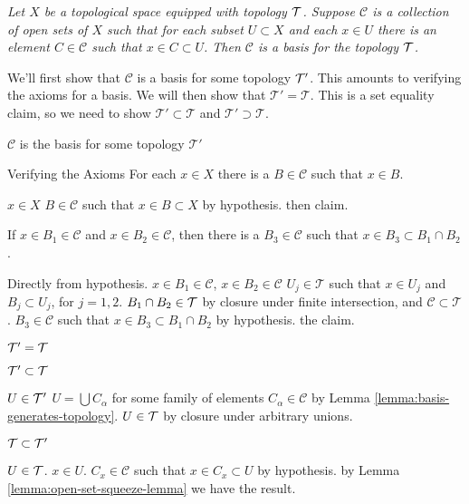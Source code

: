 %
{\itshape %
Let $X$ be a topological space equipped with topology $\mathcal{T}$.
Suppose $\mathcal{C}$ is a collection of open sets of $X$ such that for
each subset $U\subset X$ and each $x\in U$ there is an element
$C\in\mathcal{C}$ such that $x\in C\subset U$.
Then $\mathcal{C}$ is a basis for the topology $\mathcal{T}$.}

\smallskip

\begin{pfSketch}
  We'll first show that $\mathcal{C}$ is a basis for some topology
  $\mathcal{T'}$. This amounts to verifying the axioms for a basis. We
  will then show that $\mathcal{T'}=\mathcal{T}$. This is a set equality
  claim, so we need to show $\mathcal{T'}\subset\mathcal{T}$ and
  $\mathcal{T'}\supset\mathcal{T}$. 
\end{pfSketch}

\begin{spf}
  \step $\mathcal{C}$ is the basis for some topology $\mathcal{T'}$
  \begin{spf}
    Verifying the Axioms
    \step For each $x\in X$ there is a $B\in\mathcal{C}$ such that $x\in B$.
    \begin{spf}
      \Let $x\in X$
      \ThenConsider $B\in\mathcal{C}$ such that $x\in B\subset X$ by hypothesis.
      \Hence then claim.
    \end{spf}
    \step If $x\in B_{1}\in\mathcal{C}$ and
    $x\in B_{2}\in\mathcal{C}$, then there is a
    $B_{3}\in\mathcal{C}$ such that $x\in B_{3}\subset B_{1}\cap B_{2}$.
    \begin{spf}
      Directly from hypothesis.
      \Assume $x\in B_{1}\in\mathcal{C}$, $x\in B_{2}\in\mathcal{C}$
      \Consider $U_{j}\in\mathcal{T}$ such that $x\in U_{j}$ and
      $B_{j}\subset U_{j}$, for $j=1,2$.
      \Thus $B_{1}\cap B_{2}\in\mathcal{T}$ by closure under finite
      intersection, and $\mathcal{C}\subset\mathcal{T}$.
      \ThenConsider $B_{3}\in\mathcal{C}$ such that
      $x\in B_{3}\subset B_{1}\cap B_{2}$ by hypothesis.
      \Hence the claim.
    \end{spf}
  \end{spf}
  \step $\mathcal{T'}=\mathcal{T}$
  \begin{spf}
    \step $\mathcal{T'}\subset\mathcal{T}$
    \begin{spf}
      \Let $U\in\mathcal{T'}$
      \Then $U=\bigcup C_{\alpha}$ for some family of elements $C_{\alpha}\in\mathcal{C}$ by Lemma \ref{lemma:basis-generates-topology}.
      \Hence $U\in\mathcal{T}$ by closure under arbitrary unions.
    \end{spf}
    \step $\mathcal{T}\subset\mathcal{T'}$
    \begin{spf}
      \Let $U\in\mathcal{T}$.
      \Let $x\in U$.
      \ThenConsider $C_{x}\in\mathcal{C}$ such that $x\in C_{x}\subset
      U$
      by hypothesis.
      \Hence by Lemma \ref{lemma:open-set-squeeze-lemma} we have the result.\placeQED
    \end{spf}
  \end{spf}
\end{spf}

